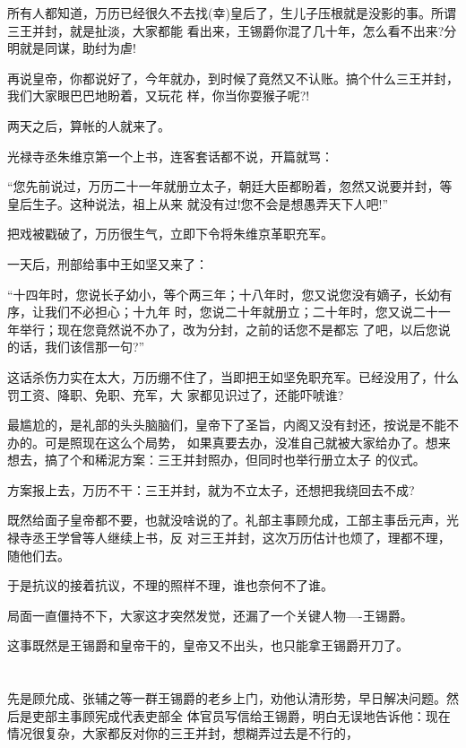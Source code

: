 \documentclass[11pt,a4paper,onecolumn]{article}
\begin{document}
所有人都知道，万历已经很久不去找(幸)皇后了，生儿子压根就是没影的事。所谓三王并封，就是扯淡，大家都能
看出来，王锡爵你混了几十年，怎么看不出来?分明就是同谋，助纣为虐!

再说皇帝，你都说好了，今年就办，到时候了竟然又不认账。搞个什么三王并封，我们大家眼巴巴地盼着，又玩花
样，你当你耍猴子呢?!

两天之后，算帐的人就来了。

光禄寺丞朱维京第一个上书，连客套话都不说，开篇就骂：

``您先前说过，万历二十一年就册立太子，朝廷大臣都盼着，忽然又说要并封，等皇后生子。这种说法，祖上从来
就没有过!您不会是想愚弄天下人吧!''

把戏被戳破了，万历很生气，立即下令将朱维京革职充军。

一天后，刑部给事中王如坚又来了：

``十四年时，您说长子幼小，等个两三年；十八年时，您又说您没有嫡子，长幼有序，让我们不必担心；十九年
时，您说二十年就册立；二十年时，您又说二十一年举行；现在您竟然说不办了，改为分封，之前的话您不是都忘
了吧，以后您说的话，我们该信那一句?''

这话杀伤力实在太大，万历绷不住了，当即把王如坚免职充军。已经没用了，什么罚工资、降职、免职、充军，大
家都见识过了，还能吓唬谁?

最尴尬的，是礼部的头头脑脑们，皇帝下了圣旨，内阁又没有封还，按说是不能不办的。可是照现在这么个局势，
如果真要去办，没准自己就被大家给办了。想来想去，搞了个和稀泥方案：三王并封照办，但同时也举行册立太子
的仪式。

方案报上去，万历不干：三王并封，就为不立太子，还想把我绕回去不成?

既然给面子皇帝都不要，也就没啥说的了。礼部主事顾允成，工部主事岳元声，光禄寺丞王学曾等人继续上书，反
对三王并封，这次万历估计也烦了，理都不理，随他们去。

于是抗议的接着抗议，不理的照样不理，谁也奈何不了谁。

局面一直僵持不下，大家这才突然发觉，还漏了一个关键人物----王锡爵。

这事既然是王锡爵和皇帝干的，皇帝又不出头，也只能拿王锡爵开刀了。

\section[\thesection]{}

先是顾允成、张辅之等一群王锡爵的老乡上门，劝他认清形势，早日解决问题。然后是吏部主事顾宪成代表吏部全
体官员写信给王锡爵，明白无误地告诉他：现在情况很复杂，大家都反对你的三王并封，想糊弄过去是不行的，
\end{document}
